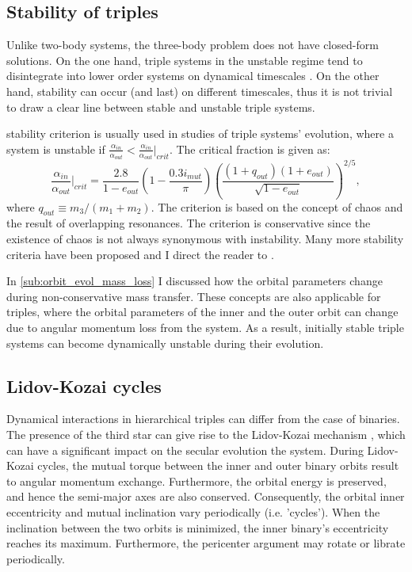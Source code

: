 \subsection{Stability of triples}\label{sub:stability_triples}

Unlike two-body systems, the three-body problem does not have closed-form solutions. On the one hand, triple systems in the unstable regime tend to disintegrate into lower order systems on dynamical timescales \citep{van2007formation}. On the other hand, stability can occur (and last) on different timescales, thus it is not trivial to draw a clear line between stable and unstable triple systems. 

\cite{mardling1999dynamics} stability criterion is usually used in studies of triple systems' evolution, where a system is unstable if
$\frac{\alpha_{in}}{\alpha_{out}} < \frac{\alpha_{in}}{\alpha_{out}} |_{crit}$. The critical fraction is given as:
\begin{equation}\label{eq:stability_regime}
    \frac{\alpha_{in}}{\alpha_{out}} |_{crit} = \frac{2.8}{1-e_{out}} (1- \frac{0.3 i_{mut}}{\pi}) \left ( \frac{(1 + q_{out})(1+e_{out})}{\sqrt{1-e_{out}}} \right )^{2/5},
\end{equation}
where $q_{out} \equiv m_3 / (m_1 + m_2)$. The criterion is based on the concept of chaos and the result of overlapping resonances. The criterion is conservative since the existence of chaos is not always synonymous with instability. Many more stability criteria have been proposed and I direct the reader to \cite{mardling2001stability,georgakarakos2008stability}.

In \cref{sub:orbit_evol_mass_loss} I discussed how the orbital parameters change during non-conservative mass transfer. These concepts are also applicable for triples, where the orbital parameters of the inner and the outer orbit can change due to angular momentum loss from the system. As a result, initially stable triple systems can become dynamically unstable during their evolution.

\subsection{Lidov-Kozai cycles}\label{sub:lidov_kozai}

Dynamical interactions in hierarchical triples can differ from the case of binaries. The presence of the third star can give rise to the Lidov-Kozai mechanism \citep{lidov1962evolution,kozai1962secular}, which can have a significant impact on the secular evolution the system. During Lidov-Kozai cycles, the mutual torque between the inner and outer binary orbits result to angular momentum exchange. Furthermore, the orbital energy is preserved, and hence the semi-major axes are also conserved. Consequently, the orbital inner eccentricity and mutual inclination vary periodically (i.e. 'cycles'). When the inclination between the two orbits is minimized, the inner binary's eccentricity reaches its maximum. Furthermore, the pericenter argument may rotate or librate periodically.

